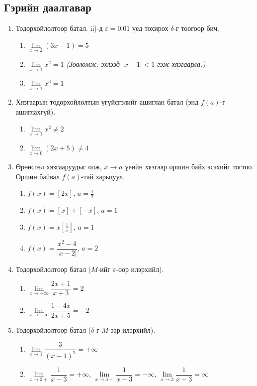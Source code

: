 \subsection*{Гэрийн даалгавар}
\begin{enumerate}
\item Тодорхойлолтоор батал. ii)-д $\varepsilon=0.01$ үед тохирох $\delta$-г тоогоор бич.
  \begin{enumerate}[label=\roman*)]
  \item $\lim\limits_{x\to2}(3x-1)=5$
  \item $\lim\limits_{x\to1}x^2=1$ \quad \textit{(Зөвлөмж: эхлээд $|x-1|<1$ гэж хязгаарла.)}
  \item $\lim\limits_{x\to1}x^3=1$
  \end{enumerate}

\item Хязгаарын тодорхойлолтын үгүйсгэлийг ашиглан батал (энд $f(a)$-г ашиглахгүй).
  \begin{enumerate}[label=\roman*)]
  \item $\lim\limits_{x\to1}x^2\ne2$
  \item $\lim\limits_{x\to0}(2x+5)\ne4$
  \end{enumerate}

\item Өрөөсгөл хязгааруудыг олж, $x\to a$ үеийн хязгаар оршин байх эсэхийг тогтоо.
Оршин байвал $f(a)$-тай харьцуул.
  \begin{enumerate}[label=\roman*)]
  \item $f(x)=[2x]$, \; $a=\frac12$
  \item $f(x)=[x]+[-x]$, \; $a=1$
  \item $f(x)=x\left[\frac1x\right]$, \; $a=1$
  \item $f(x)=\dfrac{x^2-4}{|x-2|}$, \; $a=2$
  \end{enumerate}

\item Тодорхойлолтоор батал ($M$-ийг $\varepsilon$-оор илэрхийл).
  \begin{enumerate}[label=\roman*)]
  \item $\lim\limits_{x\to+\infty}\dfrac{2x+1}{x+3}=2$
  \item $\lim\limits_{x\to-\infty}\dfrac{1-4x}{2x+5}=-2$
  \end{enumerate}

\item Тодорхойлолтоор батал ($\delta$-г $M$-ээр илэрхийл).
  \begin{enumerate}[label=\roman*)]
  \item $\lim\limits_{x\to1}\dfrac{3}{(x-1)^2}=+\infty$
  \item $\lim\limits_{x\to3+}\dfrac1{x-3}=+\infty$, \; $\lim\limits_{x\to3-}\dfrac1{x-3}=-\infty$, \; $\lim\limits_{x\to3}\dfrac1{x-3}=\infty$
  \end{enumerate}


\end{enumerate}
